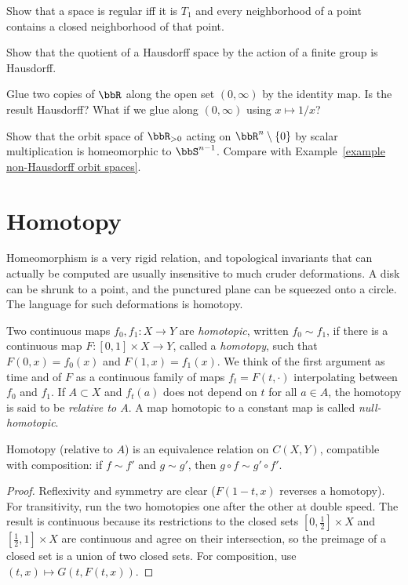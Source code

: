 \begin{xca}
    Show that a space is regular iff it is $T_1$ and every neighborhood of a point contains a closed neighborhood of that point.
\end{xca}
\begin{xca}
    Show that the quotient of a Hausdorff space by the action of a finite group is Hausdorff.
\end{xca}
\begin{xca}
    Glue two copies of $\bbR$ along the open set $(0,\infty)$ by the identity map. Is the result Hausdorff? What if we glue along $(0,\infty)$ using $x\mapsto 1/x$?
\end{xca}
\begin{xca}
    Show that the orbit space of $\bbR_{>0}$ acting on $\bbR^n\setminus\{0\}$ by scalar multiplication is homeomorphic to $\bbS^{n-1}$. Compare with Example~\ref{example non-Hausdorff orbit spaces}.
\end{xca}


\section{Homotopy}\label{sec.homotopy}

Homeomorphism is a very rigid relation, and topological invariants that can actually be computed are usually insensitive to much cruder deformations. A disk can be shrunk to a point, and the punctured plane can be squeezed onto a circle. The language for such deformations is homotopy.

\begin{defn}[Homotopy]
    Two continuous maps $f_0,f_1:X\to Y$ are \emph{homotopic}, written $f_0\sim f_1$, if there is a continuous map $F:[0,1]\times X\to Y$, called a \emph{homotopy}, such that $F(0,x)=f_0(x)$ and $F(1,x)=f_1(x)$. We think of the first argument as time and of $F$ as a continuous family of maps $f_t=F(t,\cdot)$ interpolating between $f_0$ and $f_1$. If $A\subset X$ and $f_t(a)$ does not depend on $t$ for all $a\in A$, the homotopy is said to be \emph{relative to $A$}. A map homotopic to a constant map is called \emph{null-homotopic}.
\end{defn}

\begin{prop}\label{prop homotopy equivalence relation}
    Homotopy (relative to $A$) is an equivalence relation on $C(X,Y)$, compatible with composition: if $f\sim f'$ and $g\sim g'$, then $g\circ f\sim g'\circ f'$.
\end{prop}
\begin{proof}
    Reflexivity and symmetry are clear ($F(1-t,x)$ reverses a homotopy). For transitivity, run the two homotopies one after the other at double speed. The result is continuous because its restrictions to the closed sets $[0,\frac12]\times X$ and $[\frac12,1]\times X$ are continuous and agree on their intersection, so the preimage of a closed set is a union of two closed sets. For composition, use $(t,x)\mapsto G(t,F(t,x))$.
\end{proof}


